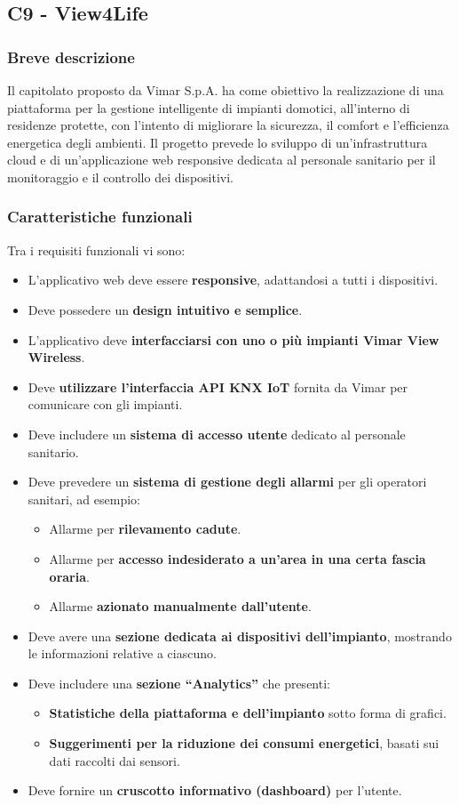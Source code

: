 \documentclass[a4paper,11pt]{article}
\begin{document}
\newpage
\subsection{C9 - View4Life}
\subsubsection{Breve descrizione}
\parbox[t]{\linewidth}{%
Il capitolato proposto da Vimar S.p.A. ha come obiettivo la realizzazione di una piattaforma per la gestione intelligente di impianti domotici, all'interno di residenze protette, con l'intento di migliorare la sicurezza, il comfort e l'efficienza energetica degli ambienti. Il progetto prevede lo sviluppo di un'infrastruttura cloud e di un'applicazione web responsive dedicata al personale sanitario per il monitoraggio e il controllo dei dispositivi.
}
\subsubsection{Caratteristiche funzionali}
Tra i requisiti funzionali vi sono:
\begin{itemize}
    \item L'applicativo web deve essere \textbf{responsive}, adattandosi a tutti i dispositivi.
    \item Deve possedere un \textbf{design intuitivo e semplice}.
    \item L'applicativo deve \textbf{interfacciarsi con uno o più impianti Vimar View Wireless}.
    \item Deve \textbf{utilizzare l'interfaccia API KNX IoT} fornita da Vimar per comunicare con gli impianti.
    \item Deve includere un \textbf{sistema di accesso utente} dedicato al personale sanitario.
    \item Deve prevedere un \textbf{sistema di gestione degli allarmi} per gli operatori sanitari, ad esempio:
    \begin{itemize}
        \item Allarme per \textbf{rilevamento cadute}.
        \item Allarme per \textbf{accesso indesiderato a un'area in una certa fascia oraria}.
        \item Allarme \textbf{azionato manualmente dall'utente}.
    \end{itemize}
    \item Deve avere una \textbf{sezione dedicata ai dispositivi dell'impianto}, mostrando le informazioni relative a ciascuno.
    \item Deve includere una \textbf{sezione ``Analytics''} che presenti:
    \begin{itemize}
        \item \textbf{Statistiche della piattaforma e dell'impianto} sotto forma di grafici.
        \item \textbf{Suggerimenti per la riduzione dei consumi energetici}, basati sui dati raccolti dai sensori.
    \end{itemize}
    \item Deve fornire un \textbf{cruscotto informativo (dashboard)} per l'utente.
\end{itemize}
\end{document}
